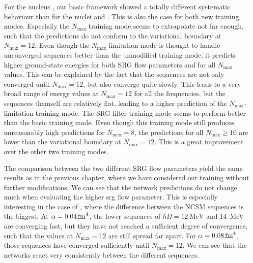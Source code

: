 For the nucleus , our basic framework showed a totally different systematic behaviour than for the nuclei  and . This is also the case for both new training modes. Especially the $N_\mathrm{max}$ training mode seems to extrapolate not far enough, such that the predictions do not conform to the variational boundary at $N_\mathrm{max} = 12$. Even though the $N_\mathrm{max}$-limitation mode is thought to handle unconverged sequences better than the unmodified training mode, it predicts higher ground-state energies for both SRG flow parameters and for all $N_\mathrm{max}$ values. This can be explained by the fact that the  sequences are not only converged until $N_\mathrm{max} = 12$, but also converge quite slowly. This leads to a very broad range of energy values at $N_\mathrm{max} = 12$ for all the frequencies, but the sequences themself are relatively flat, leading to a higher prediction of the $N_\mathrm{max}$-limitation training mode. The SRG-filter training mode seems to perform better than the basic training mode. Even though this training mode still produces unreasonably high predictions for $N_\mathrm{max} = 8$, the predictions for all $N_\mathrm{max} \geq 10$ are lower than the variational boundary at $N_\mathrm{max} = 12$. This is a great improvement over the other two training modes.

The comparison between the two different SRG flow parameters yield the same results as in the previous chapter, where we have considered our training without further modifications. We can see that the network predictions do not change much when evaluating the higher srg flow parameter. This is especially interesting in the case of , where the difference between the NCSM sequences is the biggest. At $\alpha = \srg{0.04}$, the lower sequences of $\hbar \Omega = \SI{12}{\mega\electronvolt}$ and \SI{14}{\mega\electronvolt} are converging fast, but they have not reached a sufficient degree of convergence, such that the values at $N_\mathrm{max} = 12$ are still spread far apart. For $\alpha = \srg{0.08}$, those sequences have converged sufficiently until $N_\mathrm{max} = 12$. We can see that the networks react very consistently between the different sequences.




